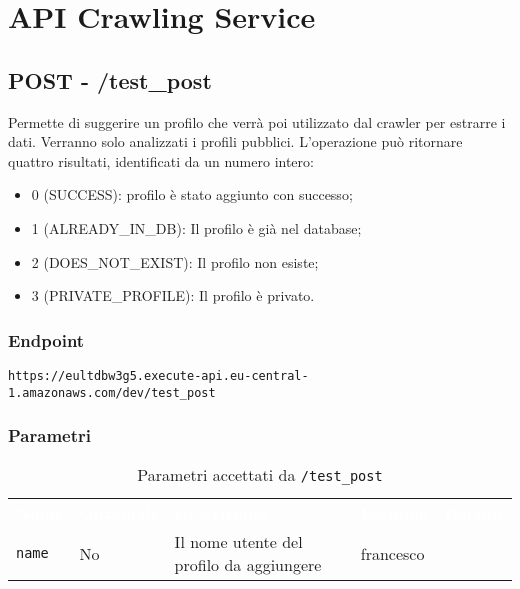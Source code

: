 \section{API Crawling Service}


\subsection{POST - /test\_post}
Permette di suggerire un profilo che verrà poi utilizzato dal crawler per estrarre i dati. Verranno solo analizzati i profili pubblici. L'operazione può ritornare quattro risultati, identificati da un numero intero:
\begin{itemize}
\item 0 (SUCCESS): profilo è stato aggiunto con successo;
\item 1 (ALREADY\_IN\_DB): Il profilo è già nel database;
\item 2 (DOES\_NOT\_EXIST): Il profilo non esiste;
\item 3 (PRIVATE\_PROFILE): Il profilo è privato.
\end{itemize}

\subsubsection{Endpoint}
\texttt{https://eultdbw3g5.execute-api.eu-central-1.amazonaws.com/dev/test\_post}

\subsubsection{Parametri}
\begin{table}[!htbp]
\renewcommand{\arraystretch}{1.5}

\begin{tabular}[t]{ m{}<{\centering}  m{}<{\centering} m{}<{\centering} m{}<{\centering}  m{}<{\centering} }
	\rowcolor{darkblue}
	\textcolor{white}{\textbf{Nome}} &\textcolor{white}{\textbf{Opzionale}} &\textcolor{white}{\textbf{Descrizione}} &\textcolor{white}{\textbf{Esempio}} &\textcolor{white}{\textbf{Default}} \\ 
\texttt{name} & No & Il nome utente del profilo da aggiungere & francesco & \\


\end{tabular}


\caption{Parametri accettati da \texttt{/test\_post}}
\end{table}

